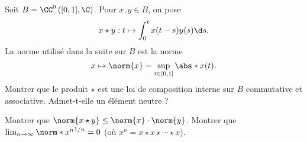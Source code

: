 \begin{enonce}
\begin{exercise}[ID={Cahier RMS6 17 (X),question a.},subtitle={},tags={}]
Soit $B=\CC^0\left( [0,1],\C \right)$. Pour $x,y\in B$, on pose
\begin{equation*}
    x \star y : t\mapsto \int_0^t x(t-s) y(s)\d s.
\end{equation*}
La norme utilisé dans la suite sur $B$ est la norme
\begin{equation*}
    x\mapsto \norm{x}=\sup_{t\in[0,1]} \abs*{x(t)}.
\end{equation*}
Montrer que le produit $\star$ est une loi de composition interne sur $B$ commutative et associative. Admet-t-elle un élément neutre ?

Montrer que $\norm{x\star y}\leq\norm{x} \cdot\norm{y}$.
Montrer que $\lim_{n\to\infty} \norm*{x^n}^{1/n}=0$ (où $x^n=x\star x\star\dotsm\star x$).
\end{exercise}
\begin{solution}
\end{solution}
\end{enonce}
